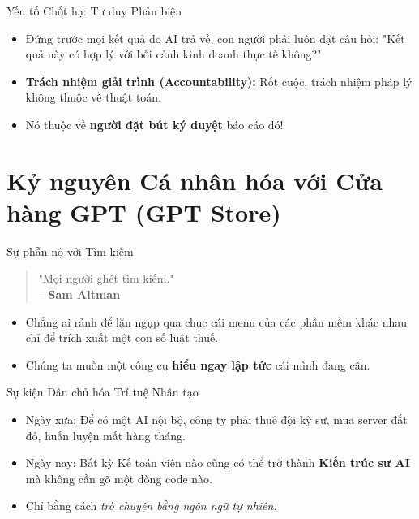 \documentclass[aspectratio=169,12pt]{beamer}
\begin{document}
\begin{frame}{Yếu tố Chốt hạ: Tư duy Phản biện}
    \begin{itemize}
        \item Đứng trước mọi kết quả do AI trả về, con người phải luôn đặt câu hỏi: "Kết quả này có hợp lý với bối cảnh kinh doanh thực tế không?"
        \item \textbf{Trách nhiệm giải trình (Accountability):} Rốt cuộc, trách nhiệm pháp lý không thuộc về thuật toán.
        \item Nó thuộc về \textbf{người đặt bút ký duyệt} báo cáo đó!
    \end{itemize}
\end{frame}


\section{Kỷ nguyên Cá nhân hóa với Cửa hàng GPT (GPT Store)}
\begin{frame}
    \tableofcontents[currentsection]
\end{frame}

\begin{frame}{Sự phẫn nộ với Tìm kiếm}
    \begin{quote}
        "Mọi người ghét tìm kiếm."\\
        \vspace{0.2cm}
        -- \textbf{Sam Altman}
    \end{quote}
    \begin{itemize}
        \item Chẳng ai rảnh để lặn ngụp qua chục cái menu của các phần mềm khác nhau chỉ để trích xuất một con số luật thuế.
        \item Chúng ta muốn một công cụ \textbf{hiểu ngay lập tức} cái mình đang cần.
    \end{itemize}
\end{frame}

\begin{frame}{Sự kiện Dân chủ hóa Trí tuệ Nhân tạo}
    \begin{itemize}
        \item Ngày xưa: Để có một AI nội bộ, công ty phải thuê đội kỹ sư, mua server đắt đỏ, huấn luyện mất hàng tháng.
        \item Ngày nay: Bất kỳ Kế toán viên nào cũng có thể trở thành \textbf{Kiến trúc sư AI} mà không cần gõ một dòng code nào.
        \item Chỉ bằng cách \textit{trò chuyện bằng ngôn ngữ tự nhiên}.
    \end{itemize}
\end{frame}
\end{document}
